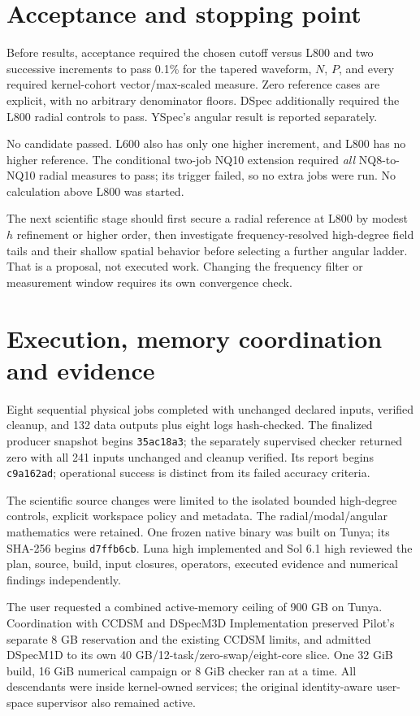 \documentclass[11pt,a4paper]{article}
\begin{document}
\section{Acceptance and stopping point}
Before results, acceptance required the chosen cutoff versus L800 and two successive increments to pass 0.1\% for the tapered waveform, $N$, $P$, and every required kernel-cohort vector/max-scaled measure. Zero reference cases are explicit, with no arbitrary denominator floors. DSpec additionally required the L800 radial controls to pass. YSpec's angular result is reported separately.

No candidate passed. L600 also has only one higher increment, and L800 has no higher reference. The conditional two-job NQ10 extension required \emph{all} NQ8-to-NQ10 radial measures to pass; its trigger failed, so no extra jobs were run. No calculation above L800 was started.

The next scientific stage should first secure a radial reference at L800 by modest $h$ refinement or higher order, then investigate frequency-resolved high-degree field tails and their shallow spatial behavior before selecting a further angular ladder. That is a proposal, not executed work. Changing the frequency filter or measurement window requires its own convergence check.

\newpage
\section{Execution, memory coordination and evidence}
Eight sequential physical jobs completed with unchanged declared inputs, verified cleanup, and 132 data outputs plus eight logs hash-checked. The finalized producer snapshot begins \texttt{35ac18a3}; the separately supervised checker returned zero with all 241 inputs unchanged and cleanup verified. Its report begins \texttt{c9a162ad}; operational success is distinct from its failed accuracy criteria.

The scientific source changes were limited to the isolated bounded high-degree controls, explicit workspace policy and metadata. The radial/modal/angular mathematics were retained. One frozen native binary was built on Tunya; its SHA-256 begins \texttt{d7ffb6cb}. Luna high implemented and Sol 6.1 high reviewed the plan, source, build, input closures, operators, executed evidence and numerical findings independently.

The user requested a combined active-memory ceiling of 900 GB on Tunya. Coordination with CCDSM and DSpecM3D Implementation preserved Pilot's separate 8 GB reservation and the existing CCDSM limits, and admitted DSpecM1D to its own 40 GB/12-task/zero-swap/eight-core slice. One 32 GiB build, 16 GiB numerical campaign or 8 GiB checker ran at a time. All descendants were inside kernel-owned services; the original identity-aware user-space supervisor also remained active.
\end{document}
